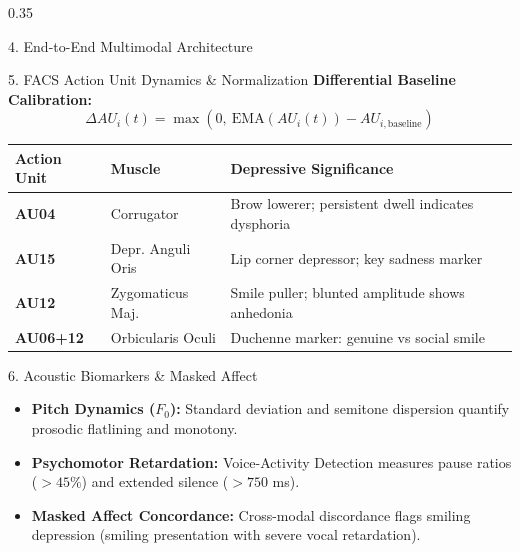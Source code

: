 \documentclass[final]{beamer}
\begin{document}
\begin{frame}[t]
\begin{columns}[t]
\begin{column}{0.35\textwidth}
\begin{posterbox}{4. End-to-End Multimodal Architecture}
\begin{center}
      \end{center}
    \end{posterbox}

    \vspace{0.3cm}

    \begin{posterbox}{5. FACS Action Unit Dynamics \& Normalization}
      \textbf{Differential Baseline Calibration:}
      \[
        \Delta AU_i(t) = \max(0, \ \text{EMA}(AU_i(t)) - AU_{i,\text{baseline}})
      \]
      \vspace{0.1cm}
      \begin{center}
      \small
      \begin{tabular}{lll}
        \toprule
        \textbf{Action Unit} & \textbf{Muscle} & \textbf{Depressive Significance} \\
        \midrule
        \textbf{AU04} & Corrugator & Brow lowerer; persistent dwell indicates dysphoria \\
        \textbf{AU15} & Depr. Anguli Oris & Lip corner depressor; key sadness marker \\
        \textbf{AU12} & Zygomaticus Maj. & Smile puller; blunted amplitude shows anhedonia \\
        \textbf{AU06+12} & Orbicularis Oculi & Duchenne marker: genuine vs social smile \\
        \bottomrule
      \end{tabular}
      \end{center}
    \end{posterbox}

    \vspace{0.3cm}

    \begin{posterbox}{6. Acoustic Biomarkers \& Masked Affect}
      \begin{itemize}
        \item \textbf{Pitch Dynamics ($F_0$):} Standard deviation and semitone dispersion quantify prosodic flatlining and monotony.
        \item \textbf{Psychomotor Retardation:} Voice-Activity Detection measures pause ratios ($>45\%$) and extended silence ($>750$ ms).
        \item \textbf{Masked Affect Concordance:} Cross-modal discordance flags smiling depression (smiling presentation with severe vocal retardation).
      \end{itemize}
    \end{posterbox}


\end{column}
\end{columns}
\end{frame}
\end{document}
